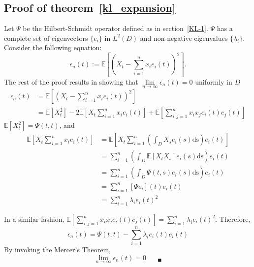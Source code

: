 \subsection*{Proof of theorem~\ref{kl_expansion}}
Let $\Psi$ be the Hilbert-Schmidt operator defined as in section~\ref{KL-1}. $\Psi$ has a complete set of eigenvectors $\{e_i\}$ in $L^2(D)$ and non-negative eigenvalues $\{\lambda_i\}$.
Consider the following equation:
\begin{equation*}
\epsilon_n(t) := \mathbb{E}\left[\left(X_t - \sum_{i=1}^{n} x_i e_i(t)\right)^2\right].
\end{equation*}
The rest of the proof results in showing that $\lim\limits_{n \rightarrow \infty} \epsilon_n(t) = 0$ uniformly in $D$
\begin{align}
\epsilon_n(t) &= \mathbb{E}\left[\left(X_t - \sum_{i=1}^{n} x_i e_i(t)\right)^2\right] \nonumber \\
&= \mathbb{E}\left[X_t^2\right] -2\mathbb{E}\left[X_t \sum_{i=1}^{n} x_i e_i(t)\right] + \mathbb{E}\left[\sum_{i,j = 1}^{n} x_i x_j e_i(t) e_j(t)\right] \nonumber
\end{align}
$\mathbb{E}\left[X_t^2\right] = \Psi(t,t)$, and
\begin{align}
\mathbb{E}\left[X_t \sum_{i=1}^{n} x_i e_i(t)\right] &= \mathbb{E}\left[X_t \sum_{i=1}^{n} \left(\int_D X_s e_i(s)\mathrm{ds}\right)e_i(t)\right] \nonumber \\
&= \sum_{i=1}^{n}\left(\int_D \mathbb{E}\left[X_t X_s\right] e_i(s) \mathrm{ds}\right)e_i(t) \nonumber \\
&= \sum_{i=1}^{n}\left(\int_D \Psi(t,s) e_i(s) \mathrm{ds}\right)e_i(t) \nonumber \\
&= \sum_{i=1}^{n} \left[\Psi e_i\right](t) e_i(t) \nonumber \\
&= \sum_{i=1}^{n} \lambda_i e_i(t)^2 \nonumber
\end{align}

In a similar fashion, $\mathbb{E}\left[\sum_{i,j = 1}^{n} x_i x_j e_i(t) e_j(t)\right] = \sum_{i=1}^{n} \lambda_i e_i(t)^2$. Therefore,
\begin{equation*}
\epsilon_n(t) =\Psi(t,t) - \sum_{i=1}^{n} \lambda_i e_i(t)e_i(t)
\end{equation*}
By invoking the \underline{Mercer's Theorem},
\begin{equation*}
\lim\limits_{n \rightarrow \infty} \epsilon_n(t) = 0 \quad \text{  }_{\blacksquare}
\end{equation*}

